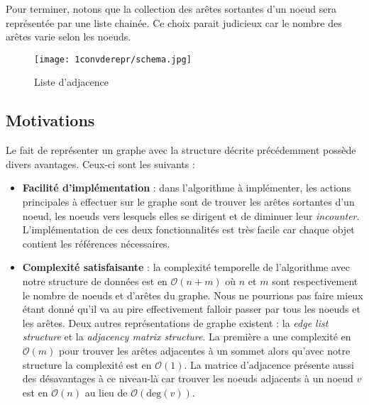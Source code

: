 Pour terminer, notons que la collection des arêtes sortantes d'un noeud sera représentée par une liste chainée. Ce choix parait judicieux car le nombre des arêtes varie selon les noeuds. 

\begin{figure}[!h]
	\centering
         \texttt{[image: 1convderepr/schema.jpg]}
         \caption{Liste d'adjacence}
          \label{adj}
\end{figure}

\subsection{Motivations}
Le fait de représenter un graphe avec la structure décrite précédemment possède divers avantages. Ceux-ci sont les suivants : \\

\begin{itemize}
\item \textbf{Facilité d'implémentation} : dans l'algorithme à implémenter, les actions principales à effectuer sur le graphe sont de trouver les arêtes sortantes d'un noeud, les noeuds vers lesquels elles se dirigent et de diminuer leur \textit{incounter}. L'implémentation de ces deux fonctionnalités est très facile car chaque objet contient les références nécessaires.

\item \textbf{Complexité satisfaisante} : la complexité temporelle de l'algorithme avec notre structure de données est en $\mathcal{O}(n + m)$ où $n$ et $m$ sont respectivement le nombre de noeuds et d'arêtes du graphe. Nous ne pourrions pas faire mieux étant donné qu'il va au pire effectivement falloir passer par tous les noeuds et les arêtes. Deux autres représentations de graphe existent : la \textit{edge list structure} et la \textit{adjacency matrix structure}. La première a une complexité en $\mathcal{O}(m)$ pour trouver les arêtes adjacentes à un sommet alors qu'avec notre structure la complexité est en $\mathcal{O}(1)$. La matrice d'adjacence présente aussi des désavantages à ce niveau-là car trouver les noeuds adjacents à un noeud $v$ est en $\mathcal{O}(n)$ au lieu de $\mathcal{O}(\text{deg}(v))$.
\end{itemize}
